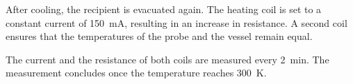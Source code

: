 After cooling, the recipient is evacuated again. 
The heating coil is set to a constant current of \SI{150}{\milli\ampere}, 
resulting in an increase in resistance.
A second coil ensures that the temperatures of the probe and 
the vessel remain equal. 

The current and the resistance of both coils are measured every \SI{2}{\minute}.
The measurement concludes once the temperature reaches \SI{300}{\kelvin}.